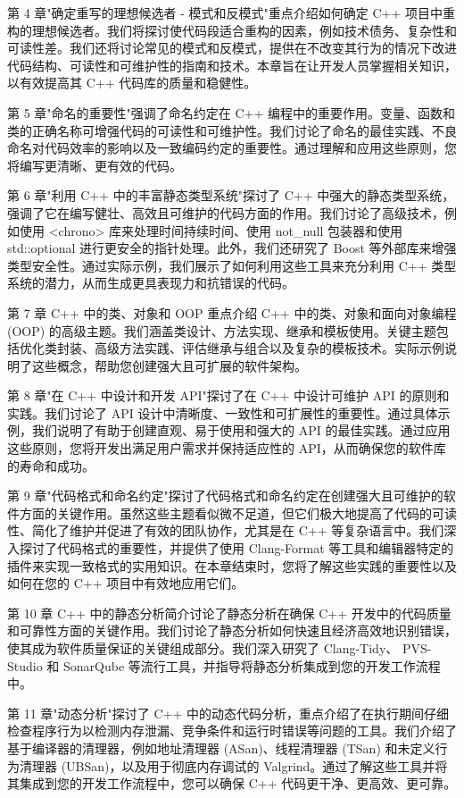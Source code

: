 第 4 章"确定重写的理想候选者 - 模式和反模式"重点介绍如何确定 C++ 项目中重构的理想候选者。我们将探讨使代码段适合重构的因素，例如技术债务、复杂性和可读性差。我们还将讨论常见的模式和反模式，提供在不改变其行为的情况下改进代码结构、可读性和可维护性的指南和技术。本章旨在让开发人员掌握相关知识，以有效提高其 C++ 代码库的质量和稳健性。

第 5 章"命名的重要性"强调了命名约定在 C++ 编程中的重要作用。变量、函数和类的正确名称可增强代码的可读性和可维护性。我们讨论了命名的最佳实践、不良命名对代码效率的影响以及一致编码约定的重要性。通过理解和应用这些原则，您将编写更清晰、更有效的代码。

第 6 章"利用 C++ 中的丰富静态类型系统"探讨了 C++ 中强大的静态类型系统，强调了它在编写健壮、高效且可维护的代码方面的作用。我们讨论了高级技术，例如使用 <chrono> 库来处理时间持续时间、使用 not\_null 包装器和使用 std::optional 进行更安全的指针处理。此外，我们还研究了 Boost 等外部库来增强类型安全性。通过实际示例，我们展示了如何利用这些工具来充分利用 C++ 类型系统的潜力，从而生成更具表现力和抗错误的代码。

第 7 章 C++ 中的类、对象和 OOP 重点介绍 C++ 中的类、对象和面向对象编程 (OOP) 的高级主题。我们涵盖类设计、方法实现、继承和模板使用。关键主题包括优化类封装、高级方法实践、评估继承与组合以及复杂的模板技术。实际示例说明了这些概念，帮助您创建强大且可扩展的软件架构。

第 8 章"在 C++ 中设计和开发 API"探讨了在 C++ 中设计可维护 API 的原则和实践。我们讨论了 API 设计中清晰度、一致性和可扩展性的重要性。通过具体示例，我们说明了有助于创建直观、易于使用和强大的 API 的最佳实践。通过应用这些原则，您将开发出满足用户需求并保持适应性的 API，从而确保您的软件库的寿命和成功。

第 9 章"代码格式和命名约定"探讨了代码格式和命名约定在创建强大且可维护的软件方面的关键作用。虽然这些主题看似微不足道，但它们极大地提高了代码的可读性、简化了维护并促进了有效的团队协作，尤其是在 C++ 等复杂语言中。我们深入探讨了代码格式的重要性，并提供了使用 Clang-Format 等工具和编辑器特定的插件来实现一致格式的实用知识。在本章结束时，您将了解这些实践的重要性以及如何在您的 C++ 项目中有效地应用它们。

第 10 章 C++ 中的静态分析简介讨论了静态分析在确保 C++ 开发中的代码质量和可靠性方面的关键作用。我们讨论了静态分析如何快速且经济高效地识别错误，使其成为软件质量保证的关键组成部分。我们深入研究了 Clang-Tidy、 PVS-Studio 和 SonarQube 等流行工具，并指导将静态分析集成到您的开发工作流程中。

第 11 章"动态分析"探讨了 C++ 中的动态代码分析，重点介绍了在执行期间仔细检查程序行为以检测内存泄漏、竞争条件和运行时错误等问题的工具。我们介绍了基于编译器的清理器，例如地址清理器 (ASan)、线程清理器 (TSan) 和未定义行为清理器 (UBSan)，以及用于彻底内存调试的 Valgrind。通过了解这些工具并将其集成到您的开发工作流程中，您可以确保 C++ 代码更干净、更高效、更可靠。

